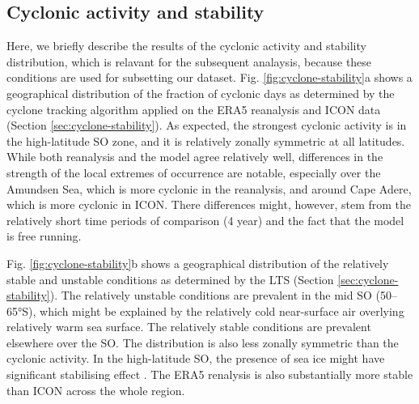 \documentclass[12pt,a4paper]{article}
\begin{document}
\subsection{Cyclonic activity and stability}

Here, we briefly describe the results of the cyclonic activity and stability
distribution, which is relavant for the subsequent analaysis, because these
conditions are used for subsetting our dataset. Fig.
\ref{fig:cyclone-stability}a shows a geographical distribution of the fraction
of cyclonic days as determined by the cyclone tracking algorithm applied on the
ERA5 reanalysis and ICON data (Section \ref{sec:cyclone-stability}). As
expected, the strongest cyclonic activity is in the high-latitude SO zone, and
it is relatively zonally symmetric at all latitudes.  While both reanalysis and
the model agree relatively well, differences in the strength of the local
extremes of occurrence are notable, especially over the Amundsen Sea, which is
more cyclonic in the reanalysis, and around Cape Adere, which is more cyclonic
in ICON. There differences might, however, stem from the relatively short time
periods of comparison (4 year) and the fact that the model is free running.

Fig. \ref{fig:cyclone-stability}b shows a geographical distribution of the
relatively stable and unstable conditions as determined by the LTS (Section
\ref{sec:cyclone-stability}).  The relatively unstable conditions are prevalent
in the mid SO (50--65°S), which might be explained by the relatively cold
near-surface air overlying relatively warm sea surface. The relatively stable
conditions are prevalent elsewhere over the SO. The distribution is also less
zonally symmetric than the cyclonic activity.  In the high-latitude SO, the
presence of sea ice might have significant stabilising effect
\citep{knight2024}. The ERA5 renalysis is also substantially more stable than
ICON across the whole region.
\end{document}
